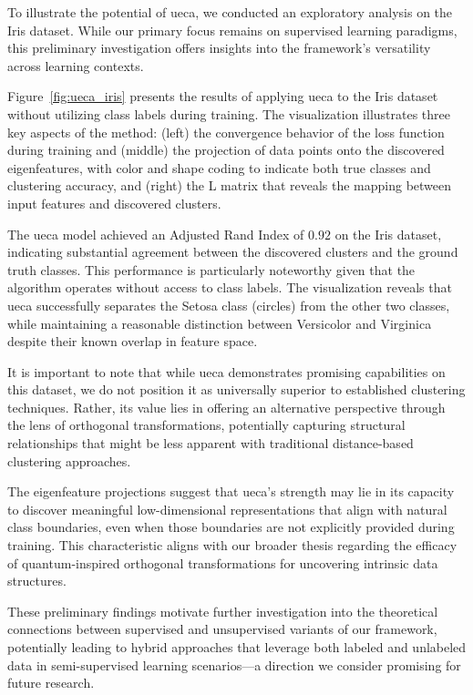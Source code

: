 \documentclass[lettersize,journal]{IEEEtran}
\begin{document}
To illustrate the potential of \gls{ueca}, we conducted an exploratory analysis on the Iris dataset. While our primary focus remains on supervised learning paradigms, this preliminary investigation offers insights into the framework's versatility across learning contexts.

Figure~\ref{fig:ueca_iris} presents the results of applying \gls{ueca} to the Iris dataset without utilizing class labels during training. The visualization illustrates three key aspects of the method: (left) the convergence behavior of the loss function during training and (middle) the projection of data points onto the discovered eigenfeatures, with color and shape coding to indicate both true classes and clustering accuracy, and (right) the L matrix that reveals the mapping between input features and discovered clusters.



The \gls{ueca} model achieved an Adjusted Rand Index of $0.92$ on the Iris dataset, indicating substantial agreement between the discovered clusters and the ground truth classes. This performance is particularly noteworthy given that the algorithm operates without access to class labels. The visualization reveals that \gls{ueca} successfully separates the Setosa class (circles) from the other two classes, while maintaining a reasonable distinction between Versicolor and Virginica despite their known overlap in feature space.

It is important to note that while \gls{ueca} demonstrates promising capabilities on this dataset, we do not position it as universally superior to established clustering techniques. Rather, its value lies in offering an alternative perspective through the lens of orthogonal transformations, potentially capturing structural relationships that might be less apparent with traditional distance-based clustering approaches. 

The eigenfeature projections suggest that \gls{ueca}'s strength may lie in its capacity to discover meaningful low-dimensional representations that align with natural class boundaries, even when those boundaries are not explicitly provided during training. This characteristic aligns with our broader thesis regarding the efficacy of quantum-inspired orthogonal transformations for uncovering intrinsic data structures.

These preliminary findings motivate further investigation into the theoretical connections between supervised and unsupervised variants of our framework, potentially leading to hybrid approaches that leverage both labeled and unlabeled data in semi-supervised learning scenarios—a direction we consider promising for future research.
\end{document}
